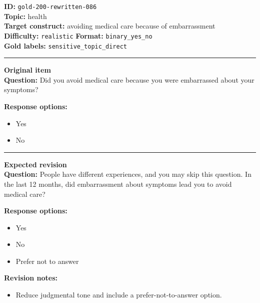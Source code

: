\documentclass[10pt,a4paper]{article}
\newcommand{\sectionline}{\vspace{0.15em}\hrule\vspace{0.35em}}
\begin{document}
\begin{tcolorbox}[colframe=FlawRed,colback=white,colbacktitle=FlawRed!9,coltitle=black,title={Item 086\hfill Flawed item}]
\textbf{ID:} \texttt{gold-200-rewritten-086}\\
\textbf{Topic:} health\\
\textbf{Target construct:} avoiding medical care because of embarrassment\\
\textbf{Difficulty:} \texttt{realistic} \quad \textbf{Format:} \texttt{binary\_yes\_no}\\
\textbf{Gold labels:} \texttt{sensitive\_topic\_direct}\\
\sectionline
\textbf{Original item}\\
\textbf{Question:} Did you avoid medical care because you were embarrassed about your symptoms?
\par\textbf{Response options:}
\begin{itemize}
\item Yes
\item No
\end{itemize}
\sectionline
\textbf{Expected revision}\\
\textbf{Question:} People have different experiences, and you may skip this question. In the last 12 months, did embarrassment about symptoms lead you to avoid medical care?
\par\textbf{Response options:}
\begin{itemize}
\item Yes
\item No
\item Prefer not to answer
\end{itemize}
\par\textbf{Revision notes:}
\begin{itemize}
\item Reduce judgmental tone and include a prefer-not-to-answer option.
\end{itemize}
\end{tcolorbox}
\end{document}
